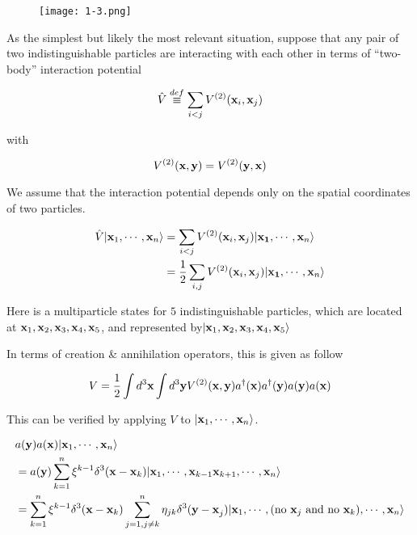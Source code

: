 \begin{wrapfigure}{l}{6cm}%
\texttt{[image: 1-3.png]}
\end{wrapfigure}

As the simplest but likely the most relevant situation, suppose that any pair of two indistinguishable particles are interacting with each other in terms of ``two-body'' interaction potential

\begin{align}
\hat{V} \overset{def}{\equiv}\sum_{i<j}V^{(2)}({\bf x}_i,{\bf x}_j)
\end{align}

with

\[V^{(2)}({\bf x,y}) = V^{(2)}({\bf y,x}) \]

We assume that the interaction potential depends only on the spatial coordinates of two particles. 

\begin{align}
\begin{split}
\hat{V}|{\bf x}_1,\cdots,{\bf x}_n\rangle &= \sum_{i<j}V^{(2)}({\bf x}_i,{\bf x}_j)|{\bf x_1},\cdots,{\bf x}_n\rangle\\
&=\frac{1}{2}\sum_{i,j}V^{(2)}({\bf x}_i,{\bf x}_j)|{\bf x_1},\cdots,{\bf x}_n\rangle
\end{split}
\end{align}

Here is a multiparticle states for $5$ indistinguishable particles, which are located at ${\bf x}_1,{\bf x}_2,{\bf x}_3,{\bf x}_4,{\bf x}_5$, and represented by$|{\bf x}_1,{\bf x}_2,{\bf x}_3,{\bf x}_4,{\bf x}_5\rangle$

In terms of creation \& annihilation operators, this is given as follow

\begin{align}\label{eqs1.7.18}
V = \frac{1}{2}\int d^3{\bf x}\int d^3{\bf y}V^{(2)}({\bf x,y})a^\dagger({\bf x})a^\dagger({\bf y})a({\bf y})a({\bf x})
\end{align}

This can be verified by applying $V$ to $|{\bf x}_1,\cdots,{\bf x}_n\rangle$. 

\[\begin{split}
&a({\bf y})a({\bf x})|{\bf x}_1,\cdots,{\bf x}_n\rangle\\
&=a({\bf y})\sum_{k=1}^n\xi^{k-1}\delta^3({\bf x - x}_k)|{\bf x}_1,\cdots,{\bf x}_{k-1}{\bf x}_{k+1},\cdots,{\bf x}_n\rangle\\
&=\sum_{k=1}^n\xi^{k-1}\delta^3({\bf x-x}_k)\sum_{j=1,j\neq k}^n\eta_{jk}\delta^3({\bf y-x}_j)|{\bf x}_1,\cdots,(\text{no }{\bf x}_j\text{ and no }{\bf x}_k),\cdots,{\bf x}_n\rangle
\end{split}\]

